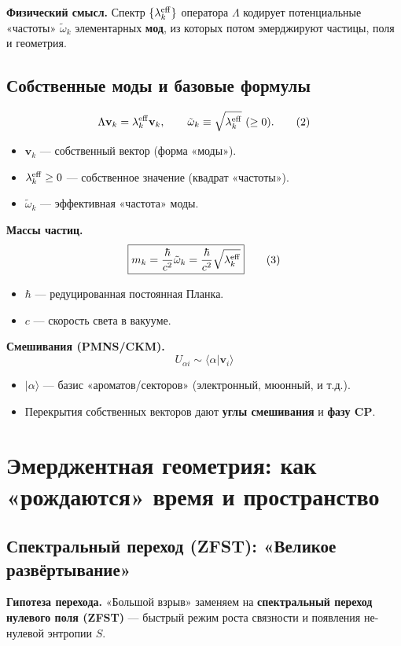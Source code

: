 \documentclass[12pt,a4paper]{article}
\begin{document}
\textbf{Физический смысл.} Спектр \(\{\lambda_k^{\rm eff}\}\) оператора \(\Lambda\) кодирует потенциальные «частоты» \(\tilde{\omega}_k\) элементарных \textbf{мод}, из которых потом эмерджируют частицы, поля и геометрия.

\subsection{Собственные моды и базовые формулы}
\[
\Lambda \mathbf{v}_k = \lambda_k^{\rm eff} \mathbf{v}_k, \qquad
\tilde{\omega}_k \equiv \sqrt{\lambda_k^{\rm eff}} \ (\ge 0). \tag{2}
\]

\begin{itemize}
    \item \(\mathbf{v}_k\) — собственный вектор (форма «моды»).
    \item \(\lambda_k^{\rm eff} \ge 0\) — собственное значение (квадрат «частоты»).
    \item \(\tilde{\omega}_k\) — эффективная «частота» моды.
\end{itemize}

\textbf{Массы частиц.}
\[
\boxed{m_k = \frac{\hbar}{c^2} \tilde{\omega}_k = \frac{\hbar}{c^2} \sqrt{\lambda_k^{\rm eff}}} \tag{3}
\]
\begin{itemize}
    \item \(\hbar\) — редуцированная постоянная Планка.
    \item \(c\) — скорость света в вакууме.
\end{itemize}

\textbf{Смешивания (PMNS/CKM).}
\[
\boxed{U_{\alpha i} \sim \langle \alpha | \mathbf{v}_i \rangle} \tag{4}
\]
\begin{itemize}
    \item \(|\alpha\rangle\) — базис «ароматов/секторов» (электронный, мюонный, и т.д.).
    \item Перекрытия собственных векторов дают \textbf{углы смешивания} и \textbf{фазу CP}.
\end{itemize}

\section{Эмерджентная геометрия: как «рождаются» время и пространство}

\subsection{Спектральный переход (ZFST): «Великое развёртывание»}
\textbf{Гипотеза перехода.} «Большой взрыв» заменяем на \textbf{спектральный переход нулевого поля (ZFST)} — быстрый режим роста связности и появления не-нулевой энтропии \(S\).
\end{document}
